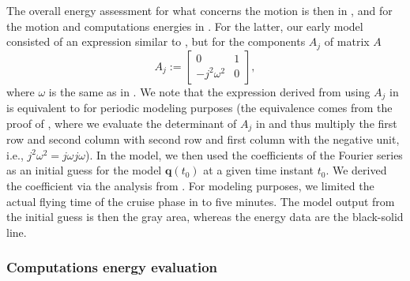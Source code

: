 The overall energy assessment for what concerns the motion is then in , and for the motion and computations energies in . For the latter, our early model consisted of an expression similar to , but for the components $A_j$ of matrix $A$
\begin{equation}\label{eq:alter-aj}
  A_j:=\begin{bmatrix}0 & 1 \\ -j^2\omega^2 & 0\end{bmatrix},
\end{equation}
where $\omega$ is the same as in . We note that the expression derived from using $A_j$ in  is equivalent to  for periodic modeling purposes (the equivalence comes from the proof of , where we evaluate the determinant of $A_j$ in  and thus multiply the first row and second column with second row and first column with the negative unit, i.e., $j^2\omega^2=j\omega j\omega$). In the model, we then used the coefficients of the Fourier series as an initial guess for the model $\mathbf{q}(t_0)$ at a given time instant $t_0$. We derived the coefficient via the analysis from . For modeling purposes, we limited the actual flying time of the cruise phase in  to five minutes. The model output from the initial guess is then the gray area, whereas the energy data are the black-solid line. 

\subsubsection*{Computations energy evaluation}

